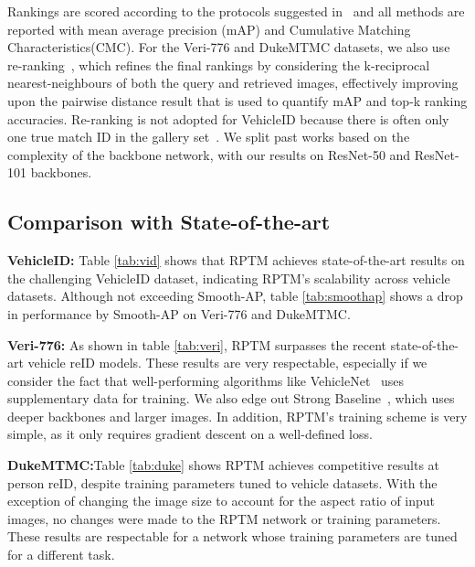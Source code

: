 \documentclass[10pt,twocolumn,letterpaper]{article}
\begin{document}
Rankings are scored according to  the  protocols suggested in~\cite{liu2016deep, liu2016large} and all methods are reported with mean average precision (mAP) and Cumulative Matching Characteristics(CMC). 
For the  Veri-776 and DukeMTMC datasets, we also use re-ranking~\cite{zhong2017re}, which refines the final rankings by considering the k-reciprocal nearest-neighbours
of both the query and retrieved images, effectively improving upon the pairwise distance result that is used to quantify mAP and top-k ranking accuracies. Re-ranking  is not adopted for VehicleID because
there is often only one true match ID in the gallery set~\cite{khorramshahi2019dual}. We split past works based on the complexity of the backbone network, with our results on ResNet-50 and ResNet-101 backbones.







\subsection{Comparison with State-of-the-art}

\textbf{VehicleID:}
Table \ref{tab:vid} shows that RPTM achieves state-of-the-art results on the challenging VehicleID dataset, indicating RPTM's scalability across vehicle datasets. Although not exceeding Smooth-AP\cite{brown2020smooth}, table \ref{tab:smoothap} shows a drop in performance by Smooth-AP on Veri-776 and DukeMTMC.

\textbf{Veri-776:}
As shown in table \ref{tab:veri}, RPTM surpasses the recent state-of-the-art vehicle reID models.
These results are very respectable, especially if we consider the fact that well-performing algorithms like  VehicleNet~\cite{zheng2020vehiclenet} uses  supplementary data for training. We also edge out Strong Baseline~\cite{huynh2021strong}, which uses deeper backbones and larger images. In addition, RPTM's
training scheme is very simple, as it only requires gradient descent on a well-defined loss.
   

\textbf{DukeMTMC:}Table \ref{tab:duke} shows  RPTM achieves competitive results at person reID, despite training parameters tuned to vehicle datasets. 
With the exception of changing the image size
to account for the aspect ratio of input images, no changes were made to the RPTM network or training parameters. These results are respectable for a network whose training parameters are tuned  for a different  task.
\end{document}
